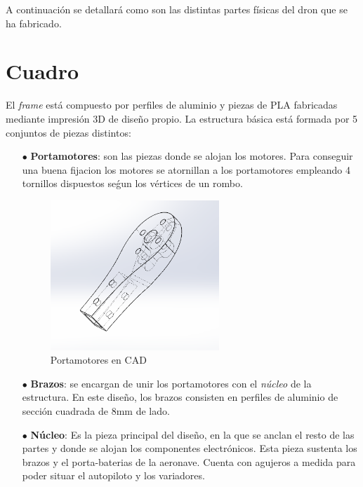A continuación se detallará como son las distintas partes físicas del dron que se ha fabricado.



\section{Cuadro}
El \textit{frame} está compuesto por perfiles de aluminio y piezas de PLA fabricadas mediante impresión 3D de diseño propio. La estructura básica está formada por 5 conjuntos de piezas distintos:
\begin{itemize}
	\item[$\bullet$] \textbf{Portamotores}: son las piezas donde se alojan los motores. Para conseguir una buena fijacion los motores se atornillan a los portamotores empleando 4 tornillos dispuestos seǵun los vértices de un rombo.
	
	\begin{figure}[htb!]
		\centering
		\includegraphics[width=0.6\textwidth]{hardware/portamotores}
		\caption{Portamotores en CAD }
		\label{portam}
	\end{figure}
	
	
	\item [$\bullet$] \textbf{Brazos}: se encargan de unir los portamotores con el \textit{núcleo} de la estructura. En este diseño, los brazos consisten en perfiles de aluminio de sección cuadrada de 8mm de lado.
	
	\item [$\bullet$] \textbf{Núcleo}: Es la pieza principal del diseño, en la que se anclan el resto de las partes y donde se alojan los componentes electrónicos. Esta pieza sustenta los brazos y el porta-baterias de la aeronave. Cuenta con agujeros a medida para poder situar el autopiloto y los variadores.
	

\end{itemize}
